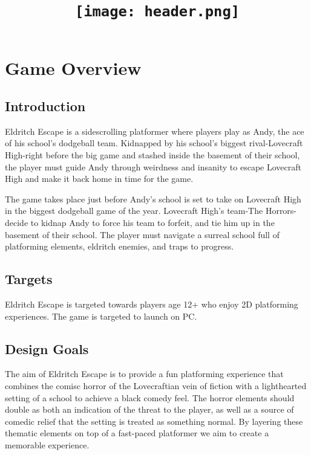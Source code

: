 \documentclass [12pt]{article}
\title{\texttt{[image: header.png]}}
\date{}
\begin{document}
\maketitle
\newpage

\section*{Game Overview}

\subsection*{Introduction}

Eldritch Escape is a sidescrolling platformer where players play as Andy, the ace of his school's dodgeball team. Kidnapped by his school's biggest rival-Lovecraft High-right before the big game and stashed inside the basement of their school, the player must guide Andy through weirdness and insanity to escape Lovecraft High and make it back home in time for the game.

The game takes place just before Andy's school is set to take on Lovecraft High in the biggest dodgeball game of the year. Lovecraft High's team-The Horrors-decide to kidnap Andy to force  his team to forfeit, and tie him up in the basement of their school. The player must navigate a surreal school full of platforming elements, eldritch enemies, and traps to progress.

\subsection*{Targets}

Eldritch Escape is targeted towards players age 12+ who enjoy 2D platforming experiences. The game is targeted to launch on PC.

\subsection*{Design Goals}

The aim of Eldritch Escape is to provide a fun platforming experience that combines the comisc horror of the Lovecraftian vein of fiction with a lighthearted setting of a school to achieve a black comedy feel. The horror elements should double as both an indication of the threat to the player, as well as a source of comedic relief that the setting is treated as something normal. By layering these thematic elements on top of a fast-paced platformer we aim to create a memorable experience.
\end{document}
